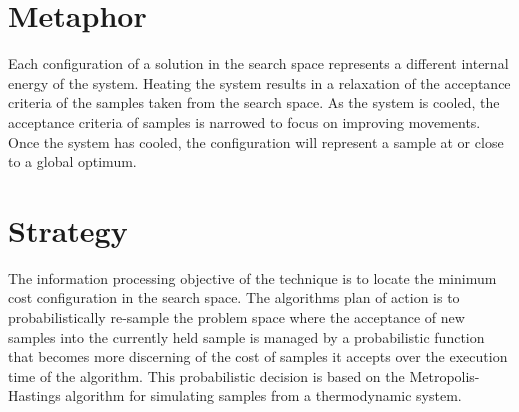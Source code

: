 \documentclass[a4paper, 11pt]{article}
\begin{document}
\section{Metaphor}
\label{sec:metaphor}
Each configuration of a solution in the search space represents a different internal energy of the system. Heating the system results in a relaxation of the acceptance criteria of the samples taken from the search space. As the system is cooled, the acceptance criteria of samples is narrowed to focus on improving movements. Once the system has cooled, the configuration will represent a sample at or close to a global optimum. 


\section{Strategy}
\label{sec:strategy}
The information processing objective of the technique is to locate the minimum cost configuration in the search space.
The algorithms plan of action is to probabilistically re-sample the problem space where the acceptance of new samples into the currently held sample is managed by a probabilistic function that becomes more discerning of the cost of samples it accepts over the execution time of the algorithm. This probabilistic decision is based on the Metropolis-Hastings algorithm for simulating samples from a thermodynamic system. 
\end{document}
